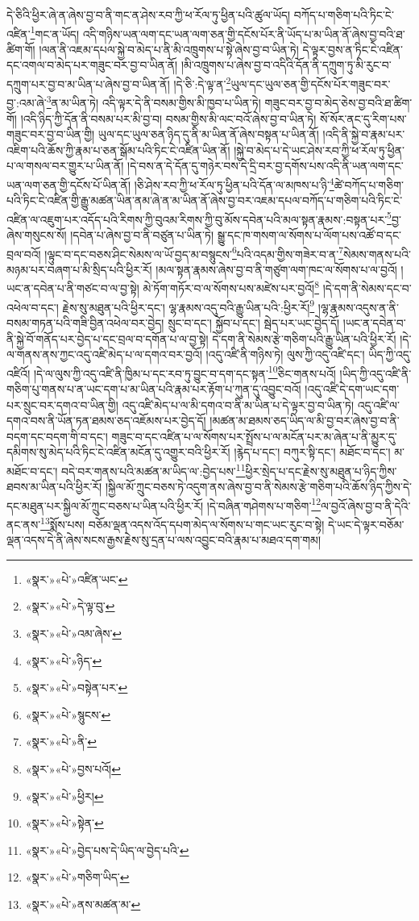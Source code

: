དེ་ཅིའི་ཕྱིར་ཞེ་ན་ཞེས་བྱ་བ་ནི་གང་ན་ཤེས་རབ་ཀྱི་ཕ་རོལ་ཏུ་ཕྱིན་པའི་ཚུལ་ཡོད། བཀོད་པ་གཅིག་པའི་ཏིང་ངེ་འཛིན་\footnote{«སྣར་»«པེ་»འཛིན་ཡང་}གང་ན་ཡོད། འདི་གཉིས་ཡན་ལག་དང་ཡན་ལག་ཅན་གྱི་དངོས་པོར་ནི་ཡོད་པ་མ་ཡིན་ནོ་ཞེས་བྱ་བའི་ཐ་ཚིག་གོ། །ལན་ནི་འཇམ་དཔལ་སྐྱེ་བ་མེད་པ་ནི་མི་འཁྲུགས་པ་སྟེ་ཞེས་བྱ་བ་ཡིན་ཏེ། དེ་ལྟར་བྱས་ན་ཏིང་ངེ་འཛིན་དང་འགལ་བ་མེད་པར་གཟུང་བར་བྱ་བ་ཡིན་ནོ། །མི་འཁྲུགས་པ་ཞེས་བྱ་བ་འདིའི་དོན་ནི་དཀྲུག་ཏུ་མི་རུང་བ་དཀྲུག་པར་བྱ་བ་མ་ཡིན་པ་ཞེས་བྱ་བ་ཡིན་ནོ། །དེ་ཅི་:དེ་ལྟ་ན་\footnote{«སྣར་»«པེ་»དེ་ལྟ་བུ་}ཡུལ་དང་ཡུལ་ཅན་གྱི་དངོས་པོར་གཟུང་བར་བྱ་:འམ་ཞེ་\footnote{«སྣར་»«པེ་»འམ་ཞེས་}ན་མ་ཡིན་ཏེ། འདི་ལྟར་དེ་ནི་བསམ་གྱིས་མི་ཁྱབ་པ་ཡིན་ཏེ། གཟུང་བར་བྱ་བ་མེད་ཅེས་བྱ་བའི་ཐ་ཚིག་གོ། །འདི་ཉིད་ཀྱི་དོན་ནི་བསམ་པར་མི་བྱ་བ། བསམ་གྱིས་མི་ལང་བའོ་ཞེས་བྱ་བ་ཡིན་ཏེ། སོ་སོར་ནང་དུ་རིག་པས་གཟུང་བར་བྱ་བ་ཡིན་གྱི། ཡུལ་དང་ཡུལ་ཅན་ཉིད་དུ་ནི་མ་ཡིན་ནོ་ཞེས་བསྟན་པ་ཡིན་ནོ། །འདི་ནི་སྐྱེ་བ་རྣམ་པར་འཇིག་པའི་ཆོས་ཀྱི་རྣམ་པ་ཅན་སྒོམ་པའི་ཏིང་ངེ་འཛིན་ཡིན་ནོ། །སྐྱེ་བ་མེད་པ་དེ་ཡང་ཤེས་རབ་ཀྱི་ཕ་རོལ་ཏུ་ཕྱིན་པ་ལ་གསལ་བར་གྱུར་པ་ཡིན་ནོ། །དེ་བས་ན་དེ་དོན་དུ་གཉེར་བས་དེ་དྲི་བར་བྱ་དགོས་པས་འདི་ནི་ཡན་ལག་དང་ཡན་ལག་ཅན་གྱི་དངོས་པོ་ཡིན་ནོ། །ཅི་ཤེས་རབ་ཀྱི་ཕ་རོལ་ཏུ་ཕྱིན་པའི་དོན་ལ་མཁས་པ་ཉི་\footnote{«སྣར་»«པེ་»ཉིད་}ཚེ་བཀོད་པ་གཅིག་པའི་ཏིང་ངེ་འཛིན་གྱི་རྒྱུ་མཚན་ཡིན་ནམ་ཞེ་ན་མ་ཡིན་ནོ་ཞེས་བྱ་བར་འཇམ་དཔལ་བཀོད་པ་གཅིག་པའི་ཏིང་ངེ་འཛིན་ལ་འཇུག་པར་འདོད་པའི་རིགས་ཀྱི་བུའམ་རིགས་ཀྱི་བུ་མོས་དབེན་པའི་མལ་སྟན་རྣམས་:བསྟན་པར་\footnote{«སྣར་»«པེ་»བསྟེན་པར་}བྱ་ཞེས་གསུངས་སོ། །དབེན་པ་ཞེས་བྱ་བ་ནི་བཙུན་པ་ཡིན་ཏེ། སྒྱུ་དང་ཁ་གསག་ལ་སོགས་པ་ལོག་པས་འཚོ་བ་དང་བྲལ་བའོ། །ལྟུང་བ་དང་བཅས་ཤིང་སེམས་ལ་ཡོ་བྱད་མ་བསྙུངས་\footnote{«སྣར་»«པེ་»སྙུངས་}པའི་འདམ་གྱིས་གཟེར་བ་ན་\footnote{«སྣར་»«པེ་»ནི་}སེམས་གནས་པའི་མཉམ་པར་བཞག་པ་མི་སྲིད་པའི་ཕྱིར་རོ། །མལ་སྟན་རྣམས་ཞེས་བྱ་བ་ནི་གཙུག་ལག་ཁང་ལ་སོགས་པ་ལ་བྱའོ། །ཡང་ན་དབེན་པ་ནི་གཙང་བ་ལ་བྱ་སྟེ། མེ་ཏོག་གཏོར་བ་ལ་སོགས་པས་མཛེས་པར་བྱའོ།\footnote{«སྣར་»«པེ་»བྱས་པའོ།} །དེ་དག་ནི་སེམས་དང་བ་འཕེལ་བ་དང་། རྗེས་སུ་མཐུན་པའི་ཕྱིར་དང་། ལྷ་རྣམས་འདུ་བའི་རྒྱུ་ཡིན་པའི་:ཕྱིར་རོ།\footnote{«སྣར་»«པེ་»ཕྱིར།} །ལྷ་རྣམས་འདུས་ན་ནི་བསམ་གཏན་པའི་གཟི་བྱིན་འཕེལ་བར་བྱེད། སྲུང་བ་དང་། སྐྱོབ་པ་དང་། སྦེད་པར་ཡང་བྱེད་དོ། །ཡང་ན་དབེན་བ་ནི་སྐྱེ་བོ་གནོད་པར་བྱེད་པ་དང་བྲལ་བ་དགོན་པ་ལ་བྱ་སྟེ། དེ་དག་ནི་སེམས་རྩེ་གཅིག་པའི་རྒྱུ་ཡིན་པའི་ཕྱིར་རོ། །དེ་ལ་གནས་ནས་ཀྱང་འདུ་འཛི་མེད་པ་ལ་དགའ་བར་བྱའོ། །འདུ་འཛི་ནི་གཉིས་ཏེ། ལུས་ཀྱི་འདུ་འཛི་དང་། ཡིད་ཀྱི་འདུ་འཛིའོ། །དེ་ལ་ལུས་ཀྱི་འདུ་འཛི་ནི་ཁྱིམ་པ་དང་རབ་ཏུ་བྱུང་བ་དག་དང་སྟན་\footnote{«སྣར་»«པེ་»སྟེན་}ཅིང་གནས་པའོ། །ཡིད་ཀྱི་འདུ་འཛི་ནི་གཅིག་པུ་གནས་པ་ན་ཡང་དག་པ་མ་ཡིན་པའི་རྣམ་པར་རྟོག་པ་ཀུན་དུ་འབྱུང་བའོ། །འདུ་འཛི་དེ་དག་ཡང་དག་པར་སྲུང་བར་དགའ་བ་ཡིན་གྱི། འདུ་འཛི་མེད་པ་ལ་མི་དགའ་བ་ནི་མ་ཡིན་པ་དེ་ལྟར་བྱ་བ་ཡིན་ཏེ། འདུ་འཛི་ལ་དགའ་བས་ནི་ཡོན་ཏན་ཐམས་ཅད་འཇོམས་པར་བྱེད་དོ། །མཚན་མ་ཐམས་ཅད་ཡིད་ལ་མི་བྱ་བར་ཞེས་བྱ་བ་ནི་བདག་དང་བདག་གི་བ་དང་། གཟུང་བ་དང་འཛིན་པ་ལ་སོགས་པར་སྤྲོས་པ་ལ་མངོན་པར་མ་ཞེན་པ་ནི་མྱུར་དུ་དམིགས་སུ་མེད་པའི་ཏིང་ངེ་འཛིན་མངོན་དུ་འགྱུར་བའི་ཕྱིར་རོ། །རྙེད་པ་དང་། བཀུར་སྟི་དང་། མཐོང་བ་དང་། མ་མཐོང་བ་དང་། བདེ་བར་གནས་པའི་མཚན་མ་ཡིད་ལ་:བྱེད་པས་\footnote{«སྣར་»«པེ་»བྱེད་པས་དེ་ཡིད་ལ་བྱེད་པའི་}ཕྱིར་སྲེད་པ་དང་རྗེས་སུ་མཐུན་པ་ཉིད་ཀྱིས་ཐབས་མ་ཡིན་པའི་ཕྱིར་རོ། །སྐྱིལ་མོ་ཀྲུང་བཅས་ཏེ་འདུག་ནས་ཞེས་བྱ་བ་ནི་སེམས་རྩེ་གཅིག་པའི་ཆོས་ཉིད་ཀྱིས་དེ་དང་མཐུན་པར་སྐྱིལ་མོ་ཀྲུང་བཅས་པ་ཡིན་པའི་ཕྱིར་རོ། །དེ་བཞིན་གཤེགས་པ་གཅིག་\footnote{«སྣར་»«པེ་»གཅིག་ཡིད་}ལ་བྱའོ་ཞེས་བྱ་བ་ནི་དེའི་ནང་ནས་\footnote{«སྣར་»«པེ་»ནས་མཚན་མ་}སྨོས་པས། བཅོམ་ལྡན་འདས་འོད་དཔག་མེད་ལ་སོགས་པ་གང་ཡང་རུང་བ་སྟེ། དེ་ཡང་དེ་ལྟར་བཅོམ་ལྡན་འདས་དེ་ནི་ཞེས་སངས་རྒྱས་རྗེས་སུ་དྲན་པ་ལས་འབྱུང་བའི་རྣམ་པ་མཐའ་དག་གམ། 